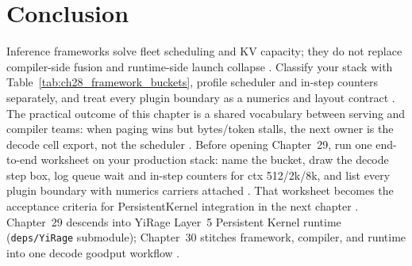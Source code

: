 \section{Conclusion}
\label{sec:ch28_conclusion}

Inference frameworks solve fleet scheduling and KV capacity; they do not replace compiler-side fusion and runtime-side launch collapse \citep{kwon2023vllm,patel2025llminference,taxbreak2026,memoryfloor2026,yirage2026,chen2020compilerbasedhardw,liu2024deepseekv3,nvidia2024cudagraphs,dao2022flashattention,dlbook,semianalysis2024tma,amd2024xdna,amd2024aie,dao2023flashdecoding,nvidia2022hopper}. Classify your stack with Table~\ref{tab:ch28_framework_buckets}, profile scheduler and in-step counters separately, and treat every plugin boundary as a numerics and layout contract \citep{patel2025llminference,taxbreak2026,memoryfloor2026,yirage2026,chen2020compilerbasedhardw,kwon2023vllm,dao2022flashattention,nvidia2024cudagraphs,dlbook}. The practical outcome of this chapter is a shared vocabulary between serving and compiler teams: when paging wins but bytes/token stalls, the next owner is the decode cell export, not the scheduler \citep{kwon2023vllm,taxbreak2026,memoryfloor2026,yirage2026,chen2020compilerbasedhardw,patel2025llminference,dao2022flashattention,dao2023flashdecoding,nvidia2024cudagraphs,liu2024deepseekv3,semianalysis2024tma,amd2024xdna,amd2024aie,dlbook}. Before opening Chapter~29, run one end-to-end worksheet on your production stack: name the bucket, draw the decode step box, log queue wait and in-step counters for ctx 512/2k/8k, and list every plugin boundary with numerics carriers attached \citep{patel2025llminference,taxbreak2026,memoryfloor2026,yirage2026,chen2020compilerbasedhardw,kwon2023vllm,nvidia2024cudagraphs,dao2022flashattention,dlbook,liu2024deepseekv3,semianalysis2024tma,amd2024aie,amd2024xdna,dao2023flashdecoding,nvidia2022hopper,dlbook}. That worksheet becomes the acceptance criteria for PersistentKernel integration in the next chapter \citep{yirage2026,chen2020compilerbasedhardw,patel2025llminference,kwon2023vllm,taxbreak2026,memoryfloor2026,dlbook}. Chapter~29 descends into YiRage Layer~5 Persistent Kernel runtime (\texttt{deps/YiRage} submodule); Chapter~30 stitches framework, compiler, and runtime into one decode goodput workflow \citep{yirage2026,chen2020compilerbasedhardw,patel2025llminference,kwon2023vllm,taxbreak2026,memoryfloor2026,dlbook}.

